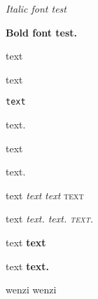 \documentclass{article}
\begin{document}
	
		\textit{Italic font test}
		
		{\bfseries Bold font test.}
		
		\textrm{text}
		
		\textsf{text}
		
		\texttt{text}
		
		\rmfamily text.
		
		\sffamily text
		
		\ttfamily text.
	
		\textup{text}
		\textit{text}
		\textsl{text}%
		\textsc{text} %
		
		\upshape text
		\itshape text.
		\slshape text.
		\scshape text.
		
		
		\textmd{text}
		\textbf{text}
		
		\mdseries text
		\bfseries text.
		
		
		\textnormal{wenzi}
		\normalfont wenzi
		
	
\end{document}
